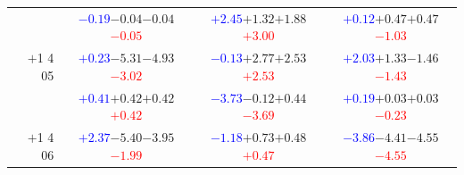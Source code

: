 \documentclass[compress]{beamer}
\begin{document}
\begin{frame}
\begin{tabular}{r | c | c | c}
          & \textcolor{blue}{$-0.19$}\hspace{0.1 cm}$-0.04$\hspace{0.1 cm}$-0.04$\hspace{0.1 cm}\textcolor{red}{$-0.05$} & \textcolor{blue}{$+2.45$}\hspace{0.1 cm}$+1.32$\hspace{0.1 cm}$+1.88$\hspace{0.1 cm}\textcolor{red}{$+3.00$} & \textcolor{blue}{$+0.12$}\hspace{0.1 cm}$+0.47$\hspace{0.1 cm}$+0.47$\hspace{0.1 cm}\textcolor{red}{$-1.03$} \\
$+$1 4 05 & \textcolor{blue}{$+0.23$}\hspace{0.1 cm}$-5.31$\hspace{0.1 cm}$-4.93$\hspace{0.1 cm}\textcolor{red}{$-3.02$} & \textcolor{blue}{$-0.13$}\hspace{0.1 cm}$+2.77$\hspace{0.1 cm}$+2.53$\hspace{0.1 cm}\textcolor{red}{$+2.53$} & \textcolor{blue}{$+2.03$}\hspace{0.1 cm}$+1.33$\hspace{0.1 cm}$-1.46$\hspace{0.1 cm}\textcolor{red}{$-1.43$} \\
          & \textcolor{blue}{$+0.41$}\hspace{0.1 cm}$+0.42$\hspace{0.1 cm}$+0.42$\hspace{0.1 cm}\textcolor{red}{$+0.42$} & \textcolor{blue}{$-3.73$}\hspace{0.1 cm}$-0.12$\hspace{0.1 cm}$+0.44$\hspace{0.1 cm}\textcolor{red}{$-3.69$} & \textcolor{blue}{$+0.19$}\hspace{0.1 cm}$+0.03$\hspace{0.1 cm}$+0.03$\hspace{0.1 cm}\textcolor{red}{$-0.23$} \\
$+$1 4 06 & \textcolor{blue}{$+2.37$}\hspace{0.1 cm}$-5.40$\hspace{0.1 cm}$-3.95$\hspace{0.1 cm}\textcolor{red}{$-1.99$} & \textcolor{blue}{$-1.18$}\hspace{0.1 cm}$+0.73$\hspace{0.1 cm}$+0.48$\hspace{0.1 cm}\textcolor{red}{$+0.47$} & \textcolor{blue}{$-3.86$}\hspace{0.1 cm}$-4.41$\hspace{0.1 cm}$-4.55$\hspace{0.1 cm}\textcolor{red}{$-4.55$} \\

\end{tabular}
\end{frame}
\end{document}
